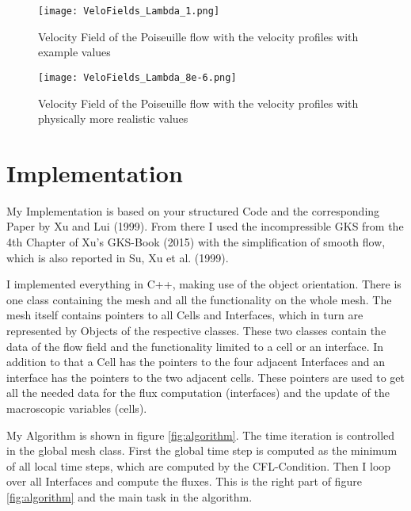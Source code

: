 \documentclass[
	pdftex,             %
	12pt,				%
	a4paper,		   	%
	english,				%
	oneside,			%
]{article}
\begin{document}
\begin{figure}
\texttt{[image: VeloFields\_Lambda\_1.png]}
\caption{Velocity Field of the Poiseuille flow with the velocity profiles with example values}
\label{fig:veloProfilePoiseuille_L1}
\end{figure}

\begin{figure}
\texttt{[image: VeloFields\_Lambda\_8e-6.png]}
\caption{Velocity Field of the Poiseuille flow with the velocity profiles with physically more realistic values}
\label{fig:veloProfilePoiseuille_L8e-6}
\end{figure}

\clearpage

\section{Implementation}

My Implementation is based on your structured Code and the corresponding Paper by Xu and Lui (1999). From there I used the incompressible GKS from the 4th Chapter of Xu's GKS-Book (2015) with the simplification of smooth flow, which is also reported in Su, Xu et al. (1999).

I implemented everything in C++, making use of the object orientation. There is one class containing the mesh and all the functionality on the whole mesh. The mesh itself contains pointers to all Cells and Interfaces, which in turn are represented by Objects of the respective classes. These two classes contain the data of the flow field and the functionality limited to a cell or an interface. In addition to that a Cell has the pointers to the four adjacent Interfaces and an interface has the pointers to the two adjacent cells. These pointers are used to get all the needed data for the flux computation (interfaces) and the update of the macroscopic variables (cells). 

My Algorithm is shown in figure \ref{fig:algorithm}. The time iteration is controlled in the global mesh class. First the global time step is computed as the minimum of all local time steps, which are computed by the CFL-Condition. Then I loop over all Interfaces and compute the fluxes. This is the right part of figure \ref{fig:algorithm} and the main task in the algorithm.
\end{document}

